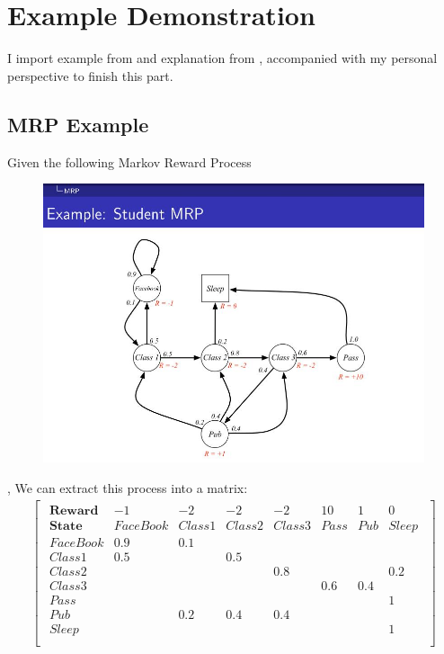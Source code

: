 \documentclass[10pt, a4paper, twocolumn]{article} %
\begin{document}
\section{Example Demonstration}
I import example from \citep{reference2} and explanation from \citep{reference1}, accompanied with my personal perspective to finish this part.

\subsection{MRP Example}
Given the following Markov Reward Process
\begin{figure}[H]
	\begin{centering}
		\includegraphics[width = \linewidth]{MRP.jpg}
	\end{centering}
\end{figure},
We can extract this process into a matrix:
\begin{align*}
	\begin{bmatrix}
		\begin{smallmatrix}
		\textbf{Reward} 	 & -1				& -2		 & -2			& -2 		 & 10		& 1		& 0\\
		\textbf{State}  	 & FaceBook	& Class1 & Class2 & Class3 & Pass & Pub & Sleep\\
		FaceBook & 0.9			& 0.1		 & 				&				 &			&			& \\
		Class1   & 0.5			&  			 & 0.5		&				 &			&			& \\
		Class2	 & 					& 			 & 				&	0.8		 &			&			& 0.2\\
		Class3	 & 					& 		 	 & 				&				 & 0.6	&	0.4	& \\
		Pass	   & 					& 		 	 & 				&				 &			&			& 1\\
		Pub			 & 					& 0.2	 	 & 0.4		&	0.4		 & 			&			& \\
		Sleep		 & 					& 		 	 & 				&				 &			&			& 1\\
		\end{smallmatrix}	
	\end{bmatrix}
\end{align*}
\end{document}
